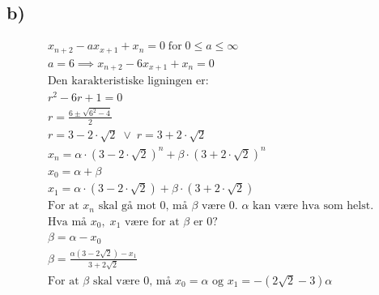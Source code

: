 \documentclass{article}
\begin{document}
\subsection*{b)} %
%
\begin{align*}
x_{n+2}-ax_{x+1}+x_n=0\;\text{for}\;0\le a\le \infty\\
a=6 \implies x_{n+2}-6x_{x+1}+x_n=0\\
\text{Den karakteristiske ligningen er:}\\
r^2 - 6r + 1 = 0\\
r = \frac{6 \pm \sqrt{6^2 - 4}}{2}\\
r = 3 - 2\cdot \sqrt{2} \;\vee\; r = 3 + 2\cdot \sqrt{2}\\
x_n = \alpha \cdot \left( 3 - 2\cdot \sqrt{2} \right ) ^ n + \beta \cdot \left( 3 + 2\cdot \sqrt{2} \right ) ^ n\\
x_0 = \alpha + \beta\\
x_1 = \alpha \cdot \left( 3 - 2\cdot \sqrt{2} \right ) + \beta \cdot \left( 3 + 2\cdot \sqrt{2} \right )\\
\text{For at } x_n \text{ skal gå mot 0, må }\beta\text{ være 0. }\alpha \text{ kan være hva som helst.}\\
\text{Hva må } x_0,\; x_1 \text{ være for at } \beta \text{ er 0?}\\
\beta = \alpha - x_0\\
\beta = \frac{\alpha (3-2\sqrt{2}) - x_1}{3+2\sqrt{2}}\\
\text{For at } \beta \text{ skal være 0, må } x_0 = \alpha \text{ og } x_1 = -(2\sqrt{2}  - 3) \alpha
\end{align*}
\end{document}
